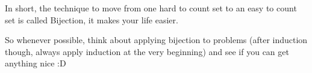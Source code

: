 \documentclass[compress]{beamer}
\begin{document}
\begin{frame}
    In short, \textcolor{NordBrightBlue}{the technique to move from one hard
    to count set to an easy to count set is called Bijection}, it makes your
    life easier.

    \pause\vspace{1em}

    So whenever possible, think about applying bijection to problems
    \textcolor{NordBlack!30!NordWhite}{(after induction though, always apply
    induction at the very beginning)} and see if you can get anything nice :D



\end{frame}
\end{document}
